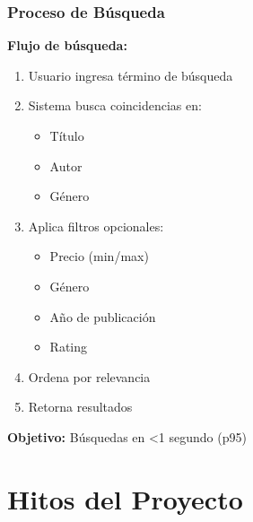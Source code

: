 \documentclass[aspectratio=169]{beamer}
\begin{document}
\begin{frame}
\frametitle{Proceso de Búsqueda}

\textbf{Flujo de búsqueda:}

\begin{enumerate}
\item Usuario ingresa término de búsqueda
\item Sistema busca coincidencias en:
  \begin{itemize}
  \item Título
  \item Autor
  \item Género
  \end{itemize}
\item Aplica filtros opcionales:
  \begin{itemize}
  \item Precio (min/max)
  \item Género
  \item Año de publicación
  \item Rating
  \end{itemize}
\item Ordena por relevancia
\item Retorna resultados
\end{enumerate}

\vspace{0.3cm}

\begin{tcolorbox}[colback=blue!5, colframe=blue!50]
\textbf{Objetivo:} Búsquedas en <1 segundo (p95)
\end{tcolorbox}

\end{frame}

\section{Hitos del Proyecto}
\end{document}
